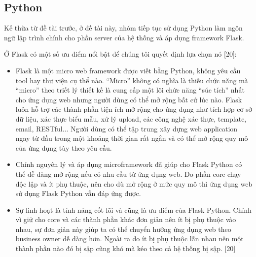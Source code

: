 \subsection{Python}
Kế thừa từ đề tài trước, ở đề tài này, nhóm tiếp tục sử dụng Python làm ngôn
ngữ lập trình chính cho phần server của hệ thống và áp dụng framework Flask.
\par
Ở Flask có một số ưu điểm nổi bật để chúng tôi quyết định lựa chọn nó [20]:
\begin{itemize}
    \item Flask là một micro web framework được viết bằng Python, không yêu cầu tool hay
          thư viện cụ thể nào. “Micro” không có nghĩa là thiếu chức năng mà “micro” theo
          triết lý thiết kế là cung cấp một lõi chức năng “súc tích” nhất cho ứng dụng
          web nhưng người dùng có thể mở rộng bất cứ lúc nào. Flask luôn hỗ trợ các thành
          phần tiện ích mở rộng cho ứng dụng như tích hợp cơ sở dữ liệu, xác thực biểu
          mẫu, xử lý upload, các công nghệ xác thực, template, email, RESTful... Người
          dùng có thể tập trung xây dựng web application ngay từ đầu trong một khoảng
          thời gian rất ngắn và có thể mở rộng quy mô của ứng dụng tùy theo yêu cầu.
    \item Chính nguyên lý và áp dụng microframework đã giúp cho Flask Python có thể dễ
          dàng mở rộng nếu có nhu cầu từ ứng dụng web. Do phần core chạy độc lập và ít
          phụ thuộc, nên cho dù mở rộng ở mức quy mô thì ứng dụng web sử dụng Flask
          Python vẫn đáp ứng được.
    \item Sự linh hoạt là tính năng cốt lõi và cũng là ưu điểm của Flask Python. Chính vì
          giữ cho core và các thành phần khác đơn giản nên ít bị phụ thuộc vào nhau, sự
          đơn giản này giúp ta có thể chuyển hướng ứng dụng web theo business owner dễ
          dàng hơn. Ngoài ra do ít bị phụ thuộc lẫn nhau nên một thành phần nào đó bị sập
          cũng khó mà kéo theo cả hệ thống bị sập. [20]
\end{itemize}
